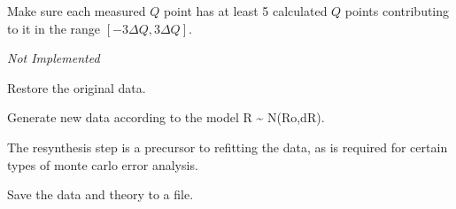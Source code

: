 \documentclass[letterpaper,10pt,english]{sphinxmanual}
\begin{document}
\begin{fulllineitems}

\begin{fulllineitems}
\label{api/probe:refl1d.probe.NeutronProbe.plot_resolution}
\end{fulllineitems}


\begin{fulllineitems}
\label{api/probe:refl1d.probe.NeutronProbe.resolution_guard}
Make sure each measured $Q$ point has at least 5 calculated $Q$
points contributing to it in the range $[-3\Delta Q,3\Delta Q]$.

\emph{Not Implemented}

\end{fulllineitems}


\begin{fulllineitems}
\label{api/probe:refl1d.probe.NeutronProbe.restore_data}
Restore the original data.

\end{fulllineitems}


\begin{fulllineitems}
\label{api/probe:refl1d.probe.NeutronProbe.resynth_data}
Generate new data according to the model R \textasciitilde{} N(Ro,dR).

The resynthesis step is a precursor to refitting the data, as is
required for certain types of monte carlo error analysis.

\end{fulllineitems}


\begin{fulllineitems}
\label{api/probe:refl1d.probe.NeutronProbe.save}
Save the data and theory to a file.

\end{fulllineitems}


\end{fulllineitems}
\end{document}
